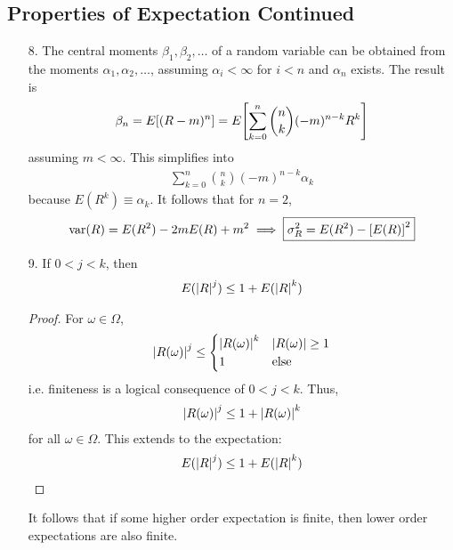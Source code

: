 \subsection{Properties of Expectation Continued}
\begin{enumerate}
    \item[8.] The central moments $\beta_1, \beta_2, \ldots$ of a random variable can be obtained from the moments $\alpha_1, \alpha_2, \ldots$, assuming $\alpha_i < \infty$ for $i < n$ and $\alpha_n$ exists. The result is
    \begin{align}
        \beta_n = E\qty[(R - m)^n] = E \qty[\sum_{k = 0}^n \binom{n}{k} (-m)^{n-k} R^k]
    \end{align}
    assuming $m < \infty$. This simplifies into
    \begin{align}
        \sum_{k=0}^n \binom{n}{k}(-m)^{n-k} \alpha_k
    \end{align}
    because $E(R^k) \equiv \alpha_k$. It follows that for $n = 2$,
    \begin{align}
        \text{var}(R) = E(R^2) - 2mE(R) + m^2 \implies \boxed{\sigma_R^2 = E(R^2) - \qty[E(R)]^2}
    \end{align}
    \item[9.] If $0 < j < k$, then
    \begin{align}
        E(\abs{R}^j) \le 1 + E(\abs{R}^k)
    \end{align}
    \begin{proof}
        For $\omega \in \Omega$,
        \begin{align}
            \abs{R(\omega)}^j \le \begin{cases}
                \abs{R(\omega)}^k & \abs{R(\omega)} \ge 1\\
                1 & \text{else}
            \end{cases}
        \end{align}
        i.e. finiteness is a logical consequence of $0 < j < k$. Thus,
        \begin{align}
            \abs{R(\omega)}^j \le 1 + \abs{R(\omega)}^k
        \end{align}
        for all $\omega \in \Omega$. This extends to the expectation:
        \begin{align}
            E(\abs{R}^j) \le 1 + E(\abs{R}^k)
        \end{align}
    \end{proof}
    It follows that if some higher order expectation is finite, then lower order expectations are also finite.
\end{enumerate}

